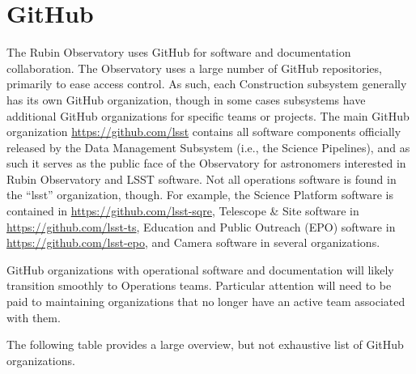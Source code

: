 \section{GitHub}

The Rubin Observatory uses GitHub for software and documentation collaboration. \citep{GitHub-cite}
The Observatory uses a large number of GitHub repositories, primarily to ease access control.
As such, each Construction subsystem generally has its own GitHub organization, though in some cases subsystems have additional GitHub organizations for specific teams or projects.
The main GitHub organization \url{https://github.com/lsst} contains all software components officially released by the Data Management Subsystem (i.e., the Science Pipelines), and as such it serves as the public face of the Observatory for astronomers interested in Rubin Observatory and LSST software.
Not all operations software is found in the ``lsst'' organization, though.
For example, the Science Platform software is contained in \url{https://github.com/lsst-sqre}, Telescope \& Site software in \url{https://github.com/lsst-ts}, Education and Public Outreach (EPO) software in \url{https://github.com/lsst-epo}, and Camera software in several organizations.

GitHub organizations with operational software and documentation will likely transition smoothly to Operations teams.
Particular attention will need to be paid to maintaining organizations that no longer have an active team associated with them.

The following table provides a large overview, but not exhaustive list of GitHub organizations.

